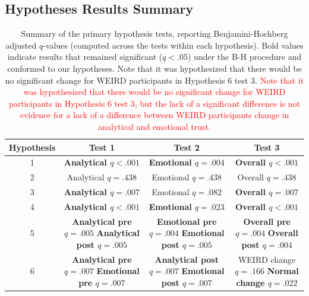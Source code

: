 \subsection{Hypotheses Results Summary}
\begin{table}[H]
  \centering
  \caption{Summary of the primary hypothesis tests, reporting Benjamini-Hochberg adjusted $q$-values (computed across the tests within each hypothesis). Bold values indicate results that remained significant ($q<.05$) under the B-H procedure and conformed to our hypotheses. Note that it was hypothesized that there would be no significant change for WEIRD participants in Hypothesis 6 test 3. \textcolor{red}{Note that it was hypothesized that there would be no significant change for WEIRD participants in Hypothesis 6 test 3, but the lack of a significant difference is not evidence for a lack of a difference between WEIRD participants change in analytical and emotional trust.}}
  \label{tab:hypotheses-summary}
\begin{tabular}{||c c c c||} 
     \hline
     Hypothesis  & Test 1 & Test 2 & Test 3 \\ [0.5ex] 
     \hline\hline
     1 & \textbf{Analytical $q<.001$} & \textbf{Emotional $q=.004$} & \textbf{Overall $q<.001$}  \\ 
     \hline
     2 & Analytical $q=.438$ & Emotional $q=.438$ & Overall $q=.438$  \\
     \hline
     3 & \textbf{Analytical $q=.007$} & Emotional $q=.082$ & \textbf{Overall $q=.007$}  \\
     \hline
    4 & \textbf{Analytical $q<.001$} & \textbf{Emotional $q=.023$} & \textbf{Overall $q<.001$}  \\
     \hline
     5 & \makecell{\textbf{Analytical pre $q=.005$} \\ \textbf{Analytical post $q=.005$}} & \makecell{\textbf{Emotional pre $q=.004$} \\ \textbf{Emotional post $q=.005$}} & \makecell{\textbf{Overall pre $q=.004$} \\ \textbf{Overall post $q=.004$}}  \\ 
     \hline
    6 & \makecell{\textbf{Analytical pre $q=.007$} \\ \textbf{Emotional pre $q=.007$}} & \makecell{\textbf{Analytical post $q=.007$} \\ \textbf{Emotional post $q=.007$}} & \makecell{WEIRD change $q=.166$ \\ \textbf{Normal change $q=.022$}}  \\ [1ex] 
     \hline
\end{tabular}
\end{table}